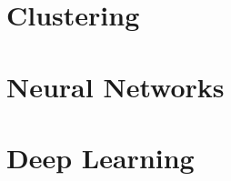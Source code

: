 \documentclass[a4paper]{book}
\begin{document}
\chapter{Clustering}
\label{ch:clustering}
\framedtext{\color{red}{TODO:}}
\chapter{Neural Networks}
\label{ch:neural-networks}
\framedtext{\color{red}{TODO:}}
\chapter{Deep Learning}
\label{ch:deep-learning}
\framedtext{\color{red}{TODO:}}





\end{document}
